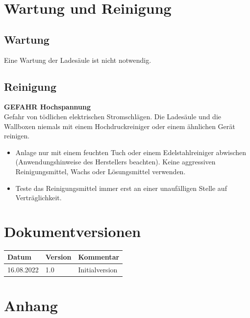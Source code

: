 \documentclass[a4paper,10pt]{article}
\newcommand{\warn}[1]{\begin{tcolorbox}[colback=boxred,colframe=red,coltext=
white,title=Warnung]#1\end{tcolorbox}}
\begin{document}
\begin{multicols*}{2}
	\section{Wartung und Reinigung}
	\subsection{Wartung}
	Eine Wartung der Ladesäule ist nicht notwendig.

	\subsection{Reinigung}
	\warn{\textbf{GEFAHR Hochspannung}\\Gefahr von tödlichen elektrischen
	Stromschlägen. Die Ladesäule und die Wallboxen niemals mit einem Hochdruckreiniger oder einem ähnlichen Gerät reinigen.}
	\begin{itemize}
		\item Anlage nur mit einem feuchten Tuch oder einem Edelstahlreiniger abwischen (Anwendungshinweise des Herstellers beachten). Keine aggressiven Reinigungsmittel, Wachs oder Lösungsmittel verwenden.
		\item Teste das Reinigungsmittel immer erst an einer unaufälligen Stelle auf Verträglichkeit.
	\end{itemize}

	\section{Dokumentversionen}
	\begin{tabular}{lll}
		\toprule
		Datum      & Version & Kommentar                   \\
		\midrule
		16.08.2022 & 1.0     & Initialversion              \\
		\bottomrule
	\end{tabular}

	\end{multicols*}
	\pagestyle{empty}
	\newpage
	\null
	\newpage
	\newpage
	\null
	\newpage
	\pagestyle{fancy}
	\section*{Anhang}
\end{document}
